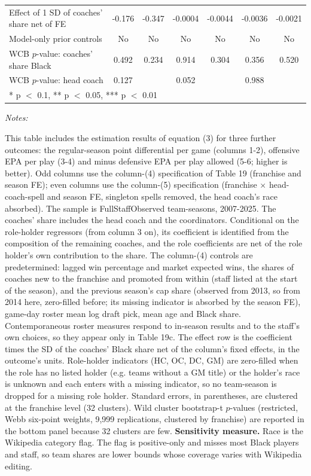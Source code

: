\begin{table}[!h]
{\begin{threeparttable}
\begin{tabular}[t]{lcccccc}
Effect of 1 SD of coaches' share net of FE & -0.176 & -0.347 & -0.0004 & -0.0044 & -0.0036 & -0.0021\\
Model-only prior controls & No & No & No & No & No & No\\
WCB $p$-value: coaches' share Black & 0.492 & 0.234 & 0.914 & 0.304 & 0.356 & 0.520\\
WCB $p$-value: head coach & 0.127 &  & 0.052 &  & 0.988 & \\
\bottomrule
\multicolumn{7}{l}{\rule{0pt}{1em}* p $<$ 0.1, ** p $<$ 0.05, *** p $<$ 0.01}\\
\end{tabular}
\begin{tablenotes}[para]
\item \textit{Notes:} 
\item This table includes the estimation results of equation (3) for three further outcomes: the regular-season point differential per game (columns 1-2), offensive EPA per play (3-4) and minus defensive EPA per play allowed (5-6; higher is better). Odd columns use the column-(4) specification of Table 19 (franchise and season FE); even columns use the column-(5) specification (franchise $\times$ head-coach-spell and season FE, singleton spells removed, the head coach's race absorbed). The sample is FullStaffObserved team-seasons, 2007-2025. The coaches' share includes the head coach and the coordinators. Conditional on the role-holder regressors (from column 3 on), its coefficient is identified from the composition of the remaining coaches, and the role coefficients are net of the role holder's own contribution to the share. The column-(4) controls are predetermined: lagged win percentage and market expected wins, the shares of coaches new to the franchise and promoted from within (staff listed at the start of the season), and the previous season's cap share (observed from 2013, so from 2014 here, zero-filled before; its missing indicator is absorbed by the season FE), game-day roster mean log draft pick, mean age and Black share. Contemporaneous roster measures respond to in-season results and to the staff's own choices, so they appear only in Table 19c. The effect row is the coefficient times the SD of the coaches' Black share net of the column's fixed effects, in the outcome's units. Role-holder indicators (HC, OC, DC, GM) are zero-filled when the role has no listed holder (e.g. teams without a GM title) or the holder's race is unknown and each enters with a missing indicator, so no team-season is dropped for a missing role holder. Standard errors, in parentheses, are clustered at the franchise level (32 clusters). Wild cluster bootstrap-t $p$-values (restricted, Webb six-point weights, 9,999 replications, clustered by franchise) are reported in the bottom panel because 32 clusters are few. \textbf{Sensitivity measure.} Race is the Wikipedia category flag. The flag is positive-only and misses most Black players and staff, so team shares are lower bounds whose coverage varies with Wikipedia editing.
\end{tablenotes}
\end{threeparttable}}
\end{table}
